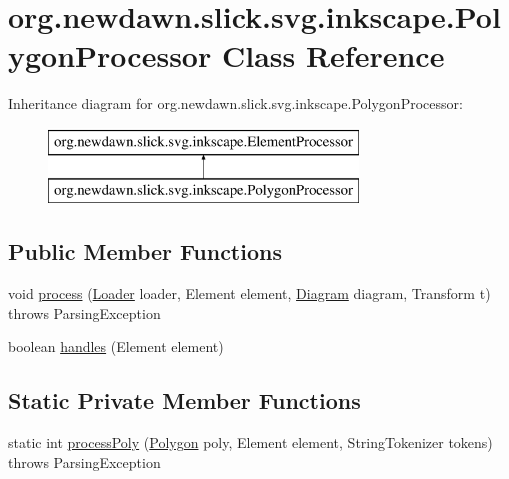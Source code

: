 \hypertarget{classorg_1_1newdawn_1_1slick_1_1svg_1_1inkscape_1_1_polygon_processor}{}\section{org.\+newdawn.\+slick.\+svg.\+inkscape.\+Polygon\+Processor Class Reference}
\label{classorg_1_1newdawn_1_1slick_1_1svg_1_1inkscape_1_1_polygon_processor}
Inheritance diagram for org.\+newdawn.\+slick.\+svg.\+inkscape.\+Polygon\+Processor\+:\begin{figure}[H]
\begin{center}
\leavevmode
\includegraphics[height=2.000000cm]{classorg_1_1newdawn_1_1slick_1_1svg_1_1inkscape_1_1_polygon_processor}
\end{center}
\end{figure}
\subsection*{Public Member Functions}
\begin{DoxyCompactItemize}
\item 
void \mbox{\hyperlink{classorg_1_1newdawn_1_1slick_1_1svg_1_1inkscape_1_1_polygon_processor_afe4b2aaaa0651a682fad619a9dddf870}{process}} (\mbox{\hyperlink{interfaceorg_1_1newdawn_1_1slick_1_1svg_1_1_loader}{Loader}} loader, Element element, \mbox{\hyperlink{classorg_1_1newdawn_1_1slick_1_1svg_1_1_diagram}{Diagram}} diagram, Transform t)  throws Parsing\+Exception 
\item 
boolean \mbox{\hyperlink{classorg_1_1newdawn_1_1slick_1_1svg_1_1inkscape_1_1_polygon_processor_ae16fc3ea9284d46c0db316bfeeca56f5}{handles}} (Element element)
\end{DoxyCompactItemize}
\subsection*{Static Private Member Functions}
\begin{DoxyCompactItemize}
\item 
static int \mbox{\hyperlink{classorg_1_1newdawn_1_1slick_1_1svg_1_1inkscape_1_1_polygon_processor_ac886c9f2c9de6f293db4158e6161b42a}{process\+Poly}} (\mbox{\hyperlink{classorg_1_1newdawn_1_1slick_1_1geom_1_1_polygon}{Polygon}} poly, Element element, String\+Tokenizer tokens)  throws Parsing\+Exception 
\end{DoxyCompactItemize}


